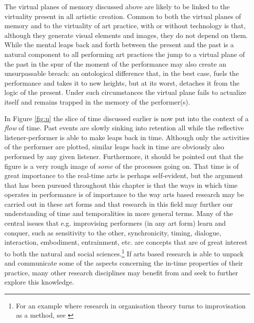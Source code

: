 The virtual planes of memory discussed above are likely to be linked to the virtuality present in all artistic creation. Common to both the virtual planes of memory and to the virtuality of art practice, with or without technology is that, although they generate visual elements and images, they do not depend on them. While the mental leaps back and forth between the present and the past is a natural component to all performing art practices the jump to a virtual plane of the past in the spur of the moment of the performance may also create an unsurpassable breach: an ontological difference that, in the best case, fuels the performance and takes it to new heights, but at its worst, detaches it from the logic of the present. Under such circumstances the virtual plane fails to actualize itself and remains trapped in the memory of the performer(s).


In Figure \ref{fig:u} the slice of time discussed earlier is now put into the context of a \emph{flow} of time. Past events are slowly sinking into retention all while the reflective listener-performer is able to make leaps back in time. Although only the activities of the performer are plotted, similar leaps back in time are obviously also performed by any given listener. Furthermore, it should be pointed out that the figure is a very rough image of \emph{some} of the processes going on. That time is of great importance to the real-time arts is perhaps self-evident, but the argument that has been pursued throughout this chapter is that the ways in which time operates in performance is of importance to the way arts based research may be carried out in these art forms and that research in this field may further our understanding of time and temporalities in more general terms. Many of the central issues that e.g. improvising performers (in any art form) learn and conquer, such as sensitivity to the other, synchronicity, timing, dialogue, interaction, embodiment, entrainment, etc. are concepts that are of great interest to both the natural and social sciences.\footnote{For an example where research in organisation theory turns to improvisation as a method, see \citep{lindahl03}} If arts based research is able to unpack and communicate some of the aspects concerning the in-time properties of their practice, many other research disciplines may benefit from and seek to further explore this knowledge.

